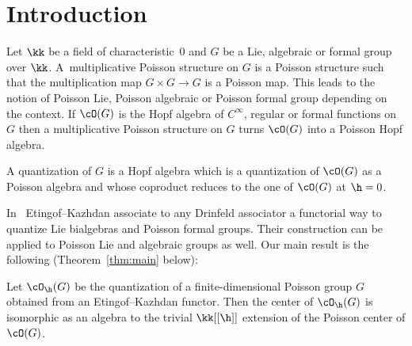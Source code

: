 \section{Introduction}

Let $\kk$ be a f\/ield of characteristic~0 and $G$ be a Lie, algebraic or formal group over $\kk$. A~multiplicative Poisson structure on $G$ is a Poisson structure such that the multiplication map $G\times G\rightarrow G$ is a Poisson map. This leads to the notion of Poisson Lie, Poisson algebraic or Poisson formal group depending on the context. If $\cO(G)$ is the Hopf algebra of $C^{\infty}$, regular or formal functions on $G$ then a multiplicative Poisson structure on $G$ turns $\cO(G)$ into a Poisson Hopf algebra.

A quantization of $G$ is a Hopf algebra which is a quantization of $\cO(G)$ as a Poisson algebra and whose coproduct reduces to the one of $\cO(G)$ at $\h=0$.

In~\cite{Etingof1996} Etingof--Kazhdan associate to any Drinfeld associator a functorial way to quantize Lie bialgebras and Poisson formal groups. Their construction can be applied to Poisson Lie and algebraic groups as well. Our main result is the following (Theorem~\ref{thm:main} below):
\begin{thm}\label{thm:intro}
	Let $\cO_\h(G)$ be the quantization of a finite-dimensional Poisson group $G$ obtained from an Etingof--Kazhdan functor. Then the center of $\cO_\h(G)$ is isomorphic as an algebra to the trivial $\kk[[\h]]$ extension of the Poisson center of $\cO(G)$.
\end{thm}
